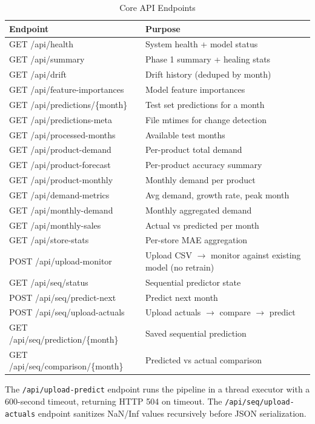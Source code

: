 \documentclass[conference]{IEEEtran}
\begin{document}
\begin{table}[htbp]
\caption{Core API Endpoints}
\centering
\renewcommand{\arraystretch}{1.1}
\begin{tabular}{|l|l|}
\hline
\textbf{Endpoint} & \textbf{Purpose} \\
\hline
GET /api/health & System health + model status \\
GET /api/summary & Phase 1 summary + healing stats \\
GET /api/drift & Drift history (deduped by month) \\
GET /api/feature-importances & Model feature importances \\
GET /api/predictions/\{month\} & Test set predictions for a month \\
GET /api/predictions-meta & File mtimes for change detection \\
GET /api/processed-months & Available test months \\
GET /api/product-demand & Per-product total demand \\
GET /api/product-forecast & Per-product accuracy summary \\
GET /api/product-monthly & Monthly demand per product \\
GET /api/demand-metrics & Avg demand, growth rate, peak month \\
GET /api/monthly-demand & Monthly aggregated demand \\
GET /api/monthly-sales & Actual vs predicted per month \\
GET /api/store-stats & Per-store MAE aggregation \\
POST /api/upload-monitor & Upload CSV $\rightarrow$ monitor against existing model (no retrain) \\
GET /api/seq/status & Sequential predictor state \\
POST /api/seq/predict-next & Predict next month \\
POST /api/seq/upload-actuals & Upload actuals $\rightarrow$ compare $\rightarrow$ predict \\
GET /api/seq/prediction/\{month\} & Saved sequential prediction \\
GET /api/seq/comparison/\{month\} & Predicted vs actual comparison \\
\hline
\end{tabular}
\label{tab:api}
\end{table}

The \texttt{/api/upload-predict} endpoint runs the pipeline in a thread executor with a 600-second timeout, returning HTTP 504 on timeout. The \texttt{/api/seq/upload-actuals} endpoint sanitizes NaN/Inf values recursively before JSON serialization.
\end{document}
